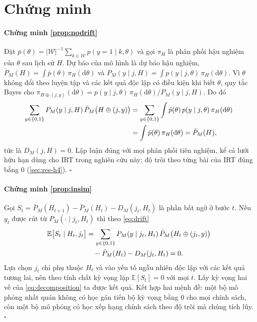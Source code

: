 \documentclass[a4paper,preprint,12pt,authoryear]{elsarticle}
\begin{document}

\appendix
\section{Chứng minh}\label{app:proofs}

\paragraph{Chứng minh \cref{prop:nodrift}} Đặt $\bar p(\theta)=|\mathcal W|^{-1}\sum_{k\in\mathcal W}p(y=1\mid k,\theta)$ và gọi $\pi_H$ là phân phối hậu nghiệm của $\theta$ sau lịch sử $H$. Dự báo của mô hình là dự báo hậu nghiệm, $\bar P_M(H)=\int\bar p(\theta)\,\pi_H(\mathrm d\theta)$ và $P_M(y\mid j,H)=\int p(y\mid j,\theta)\,\pi_H(\mathrm d\theta)$. Vì $\theta$ không đổi theo luyện tập và các kết quả độc lập có điều kiện khi biết $\theta$, quy tắc Bayes cho $\pi_{H\oplus(j,y)}(\mathrm d\theta)=p(y\mid j,\theta)\,\pi_H(\mathrm d\theta)/P_M(y\mid j,H)$. Do đó
\begin{align}
\sum_{y\in\{0,1\}}P_M(y\mid j,H)\,\bar P_M\bigl(H\oplus(j,y)\bigr)
&=\sum_{y\in\{0,1\}}\int\bar p(\theta)\,p(y\mid j,\theta)\,\pi_H(\mathrm d\theta)\notag\\
&=\int\bar p(\theta)\,\pi_H(\mathrm d\theta)=\bar P_M(H),
\end{align}
tức là $D_M(j,H)=0$. Lập luận đúng với mọi phân phối tiên nghiệm, kể cả lưới hữu hạn dùng cho IRT trong nghiên cứu này; độ trôi theo từng bài của IRT đúng bằng 0 (\cref{sec:res-h4}). $\square$

\paragraph{Chứng minh \cref{prop:insim}} Gọi $S_t=\bar P_M(H_{t+1})-\bar P_M(H_t)-D_M(j_t,H_t)$ là phần bất ngờ ở bước $t$. Nếu $y_t$ được rút từ $P_M(\cdot\mid j_t,H_t)$ thì theo \eqref{eq:drift}
\begin{align}
\mathbb E\bigl[S_t\mid H_t,j_t\bigr]
&=\sum_{y\in\{0,1\}}P_M(y\mid j_t,H_t)\,\bar P_M\bigl(H_t\oplus(j_t,y)\bigr)\notag\\
&\quad-\bar P_M(H_t)-D_M(j_t,H_t)=0.
\end{align}
Lựa chọn $j_t$ chỉ phụ thuộc $H_t$ và vào yếu tố ngẫu nhiên độc lập với các kết quả tương lai, nên theo tính chất kỳ vọng lặp $\mathbb E[S_t]=0$ với mọi $t$. Lấy kỳ vọng hai vế của \eqref{eq:decomposition} ta được kết quả. Kết hợp hai mệnh đề: một bộ mô phỏng nhất quán không có học gán tiến bộ kỳ vọng bằng 0 cho mọi chính sách, còn một bộ mô phỏng có học xếp hạng chính sách theo độ trôi mà chúng tích lũy. $\square$
\end{document}
